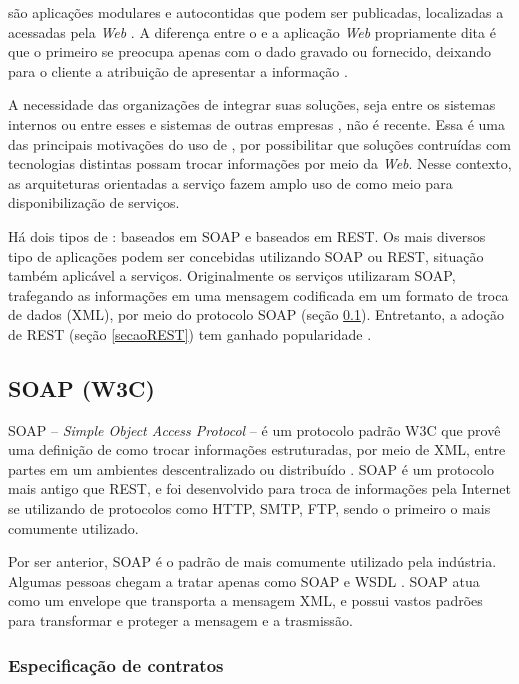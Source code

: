 \ws{} são aplicações modulares e autocontidas que podem ser publicadas,
localizadas a acessadas pela \textit{Web} \cite{alonso2004web}. A diferença
entre o \ws{} e a aplicação \textit{Web} propriamente dita é que o primeiro se
preocupa apenas com o dado gravado ou fornecido, deixando para o cliente a atribuição de apresentar a
informação \cite{serrano2014service}.

A necessidade das organizações de integrar suas soluções, seja
entre os sistemas internos ou entre esses e sistemas de outras empresas
\cite{rao2004survey}, não é recente. Essa é uma das principais motivações do uso
de \ws{}, por possibilitar que soluções contruídas com tecnologias distintas possam trocar
informações por meio da \textit{Web}. Nesse contexto, as arquiteturas
orientadas a serviço fazem amplo uso de \ws{} como meio para disponibilização de serviços.

Há dois tipos de \ws{}: baseados em SOAP e baseados em REST. Os mais diversos
tipo de aplicações podem ser concebidas utilizando \wss{} SOAP ou REST,
situação também aplicável a serviços.
Originalmente os serviços utilizaram \ws{} SOAP, trafegando as informações em
uma mensagem codificada em um formato de troca de dados (XML), por meio do
protocolo SOAP (seção \ref{secaoSOAP}). Entretanto, a adoção de \ws{} REST
(seção \ref{secaoREST}) tem ganhado popularidade \cite{mumbaikar2013web}.

\subsection{SOAP (W3C) }
\label{secaoSOAP}
\vspace{-6mm}

SOAP -- \textit{Simple Object Access Protocol} -- é um protocolo padrão W3C que
provê uma definição de como trocar informações estruturadas, por meio de XML, entre
partes em um ambientes descentralizado ou distribuído \cite{WSDLSite}. SOAP é um
protocolo mais antigo que REST, e foi desenvolvido para troca de informações
pela Internet se utilizando de protocolos como HTTP, SMTP, FTP, sendo o primeiro
o mais comumente utilizado.

Por ser anterior, SOAP é o padrão de \ws{} mais comumente utilizado pela
indústria.
Algumas pessoas chegam a tratar \ws{} apenas como SOAP e WSDL
\cite{serrano2014service}. SOAP atua como um envelope que transporta a mensagem
XML, e possui vastos padrões para transformar e proteger a mensagem e a
trasmissão. 


\subsubsection{Especificação de contratos}
\vspace{-6mm}

